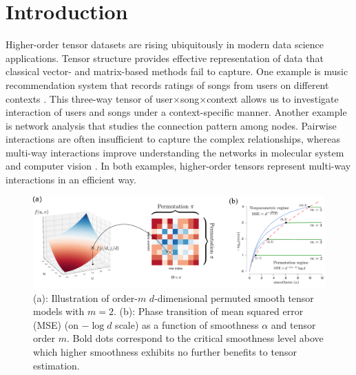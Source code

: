 \documentclass{article}
\theoremstyle{definition}
\begin{document}
\section{Introduction}\label{sec:int}
\vspace{-.4cm}
Higher-order tensor datasets are rising ubiquitously in modern data science applications.
Tensor structure provides effective representation of data that classical vector- and matrix-based methods fail to capture. 
One example is music recommendation system that records ratings of songs from users on different contexts \citep{baltrunas2011incarmusic}. This three-way tensor of user$\times$song$\times$context allows us to investigate interaction of users and songs under a context-specific manner.
Another example is network analysis that studies the connection pattern among nodes.  Pairwise interactions are often insufficient to capture the complex relationships, whereas multi-way interactions improve understanding the networks in molecular system \citep{Michoel2012AlignmentAI} and computer vision \citep{Agarwal2006HigherOL}. In both examples, higher-order tensors represent multi-way interactions in an efficient way.



\begin{figure}[h]
    \centering
    \includegraphics[width = .6\textwidth]{figures/semantic_new.pdf}
    \caption{(a): Illustration of order-$m$ $d$-dimensional permuted smooth tensor models with $m=2$. (b): Phase transition of mean squared error (MSE) (on $-\log d$ scale) as a function of smoothness
$\alpha$ and tensor order $m$. Bold dots correspond to the critical smoothness level above which higher
smoothness exhibits no further benefits to tensor estimation.}
    \label{fig:rate}
   \vspace{-.3cm}
\end{figure}
\end{document}
